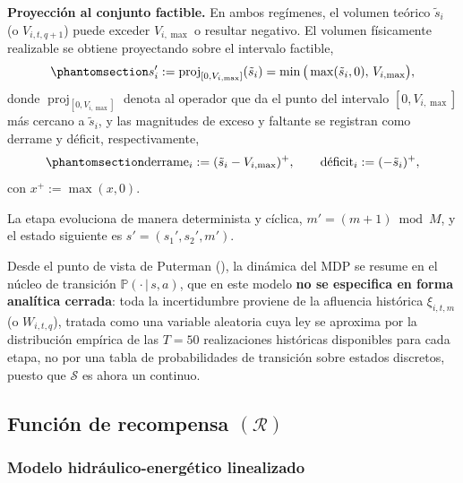 \documentclass[
  spanish,
  letterpaper,
]{scrreprt}
\theoremstyle{definition}
\theoremstyle{remark}
\begin{document}
\textbf{Proyección al conjunto factible.} En ambos regímenes, el volumen
teórico \(\tilde s_i\) (o \(V_{i,t,q+1}\)) puede exceder \(V_{i,\max}\)
o resultar negativo. El volumen físicamente realizable se obtiene
proyectando sobre el intervalo factible,
\begin{equation}\protect\phantomsection\label{eq-proyeccion}{s_i' := \operatorname{proj}_{[0,V_{i,\max}]}(\tilde s_i) = \min\big(\max(\tilde s_i,0),\,V_{i,\max}\big),}\end{equation}
donde \(\operatorname{proj}_{[0,V_{i,\max}]}\) denota al operador que da
el punto del intervalo \([0,V_{i,\max}]\) más cercano a \(\tilde s_i\),
y las magnitudes de exceso y faltante se registran como derrame y
déficit, respectivamente,
\begin{equation}\protect\phantomsection\label{eq-derrame-deficit}{\text{derrame}_i := (\tilde s_i - V_{i,\max})^+, \qquad \text{déficit}_i := (-\tilde s_i)^+,}\end{equation}
con \(x^+:=\max(x,0)\).

La etapa evoluciona de manera determinista y cíclica,
\(m'=(m+1)\bmod M\), y el estado siguiente es \(s'=(s_1',s_2',m')\).

Desde el punto de vista de Puterman
(), la dinámica del MDP se resume
en el núcleo de transición \(\mathbb P(\cdot\,|\,s,a)\), que en este
modelo \textbf{no se especifica en forma analítica cerrada}: toda la
incertidumbre proviene de la afluencia histórica \(\xi_{i,t,m}\) (o
\(W_{i,t,q}\)), tratada como una variable aleatoria cuya ley se aproxima
por la distribución empírica de las \(T=50\) realizaciones históricas
disponibles para cada etapa, no por una tabla de probabilidades de
transición sobre estados discretos, puesto que \(\mathcal S\) es ahora
un continuo.

\subsection{\texorpdfstring{Función de recompensa
\((\mathcal{R})\)}{Función de recompensa (\textbackslash mathcal\{R\})}}\label{sec-recompensa}

\subsubsection{Modelo hidráulico-energético
linealizado}\label{modelo-hidruxe1ulico-energuxe9tico-linealizado}
\end{document}
